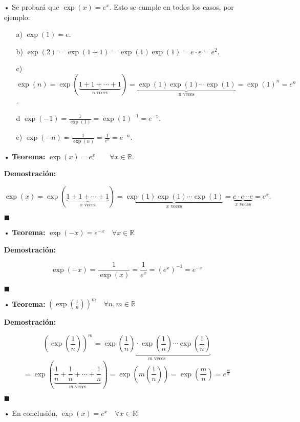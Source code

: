 \documentclass[pts12]{article}
\numberwithin{equation}{section}
\newcommand{\Col}{\color{ProcessBlue}}
\newcommand{\paratodoxen}[2]{\quad \forall {#1}\in\mathbb{#2}}
\begin{document}
\begin{itemize}
\item[\Col •] Se probará que $\exp(x)=e^x$. Esto se cumple en todos los casos, por ejemplo:

\begin{enumerate}
\item[a)] $\exp(1)=e$.
\item[b)] $\exp(2)=\exp(1+1)=\exp(1)\exp(1)=e\cdot e=e^2$.
\item[c)] $\exp(n)=\exp(\underbrace{1+1+\cdots+1}_{\mbox{n veces}})=\underbrace{\exp(1)\exp(1)\cdots\exp(1)}_{\mbox{n veces}}=\exp(1)^n=e^n$.
\item[d] $\exp(-1)=\frac{1}{\exp(1)}=\exp(1)^{-1}=e^{-1}$.
\item[e)] $\exp(-n)=\frac{1}{\exp(n)}=\frac{1}{e^n}=e^{-n}$.
\end{enumerate}

\item[\Col •] \textbf{Teorema:} $\exp(x)=e^{x}\quad\paratodoxen{x}{\mathbb{R}}$.

\textbf{Demostración:} 

$$ \exp(x)=\exp(\underbrace{1+1+\cdots+1}_{\mbox{$x$ veces}})=\underbrace{\exp(1)\exp(1)\cdots\exp(1)}_{\mbox{$x$ veces}}=\underbrace{e\cdot e\cdots e}_{\mbox{$x$ veces}}=e^x.$$

\begin{flushright}
$\blacksquare$
\end{flushright}

\item[\Col •] \textbf{Teorema:} $\exp(-x)=e^{-x} \quad \forall x\in\mathbb{R}$

\textbf{Demostración:}

$$ \exp(-x)=\frac{1}{\exp(x)}=\frac{1}{e^{x}}=(e^x)^{-1}=e^{-x} $$

\begin{flushright}
$\blacksquare$
\end{flushright}

\item[\Col •] \textbf{Teorema:} $\left(\exp\left(\frac{1}{n}\right)\right)^m \paratodoxen{n,m}{R}$

\textbf{Demostración:} 

$$ \left(\exp\left(\frac{1}{n}\right)\right)^m=\underbrace{\exp\left(\frac{1}{n}\right)\cdot\exp\left(\frac{1}{n}\right)\cdots\exp\left(\frac{1}{n}\right)}_{\mbox{$m$ veces}} $$
$$ =\exp\left( \underbrace{\frac{1}{n}+\frac{1}{n}+\cdots+\frac{1}{n}}_{\mbox{$m$ veces}} \right)=\exp\left( m\left(\frac{1}{n}\right) \right)=\exp\left( \frac{m}{n} \right)=e^{\frac{m}{n}} $$

\begin{flushright}
$\blacksquare$
\end{flushright}

\item[\Col •] En conclusión, $\exp(x)=e^x \paratodoxen{x}{R}$.

\end{itemize}
\end{document}
